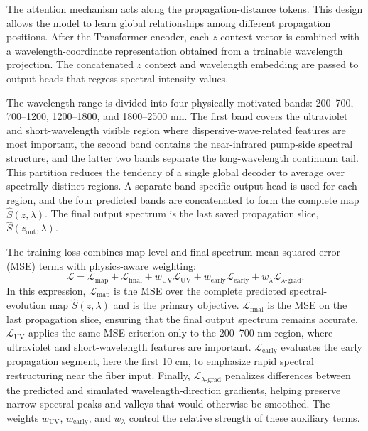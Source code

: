 \documentclass[conference,letterpaper]{IEEEtran}
\begin{document}
The attention mechanism acts along the propagation-distance tokens. This design allows the model to learn global relationships among different propagation positions. After the Transformer encoder, each $z$-context vector is combined with a wavelength-coordinate representation obtained from a trainable wavelength projection. The concatenated $z$ context and wavelength embedding are passed to output heads that regress spectral intensity values.

The wavelength range is divided into four physically motivated bands: 200--700, 700--1200, 1200--1800, and 1800--2500 nm. The first band covers the ultraviolet and short-wavelength visible region where dispersive-wave-related features are most important, the second band contains the near-infrared pump-side spectral structure, and the latter two bands separate the long-wavelength continuum tail. This partition reduces the tendency of a single global decoder to average over spectrally distinct regions. A separate band-specific output head is used for each region, and the four predicted bands are concatenated to form the complete map $\hat{S}(z,\lambda)$. The final output spectrum is the last saved propagation slice, $\hat{S}(z_{\mathrm{out}},\lambda)$.

The training loss combines map-level and final-spectrum mean-squared error (MSE) terms with physics-aware weighting:
\begin{equation}
\mathcal{L}
=
\mathcal{L}_{\mathrm{map}}
+
\mathcal{L}_{\mathrm{final}}
+
w_{\mathrm{UV}}\mathcal{L}_{\mathrm{UV}}
+
w_{\mathrm{early}}\mathcal{L}_{\mathrm{early}}
+
w_{\lambda}\mathcal{L}_{\lambda\text{-grad}} .
\end{equation}
In this expression, $\mathcal{L}_{\mathrm{map}}$ is the MSE over the complete predicted spectral-evolution map $\hat{S}(z,\lambda)$ and is the primary objective. $\mathcal{L}_{\mathrm{final}}$ is the MSE on the last propagation slice, ensuring that the final output spectrum remains accurate. $\mathcal{L}_{\mathrm{UV}}$ applies the same MSE criterion only to the 200--700 nm region, where ultraviolet and short-wavelength features are important. $\mathcal{L}_{\mathrm{early}}$ evaluates the early propagation segment, here the first 10 cm, to emphasize rapid spectral restructuring near the fiber input. Finally, $\mathcal{L}_{\lambda\text{-grad}}$ penalizes differences between the predicted and simulated wavelength-direction gradients, helping preserve narrow spectral peaks and valleys that would otherwise be smoothed. The weights $w_{\mathrm{UV}}$, $w_{\mathrm{early}}$, and $w_{\lambda}$ control the relative strength of these auxiliary terms.
\end{document}
